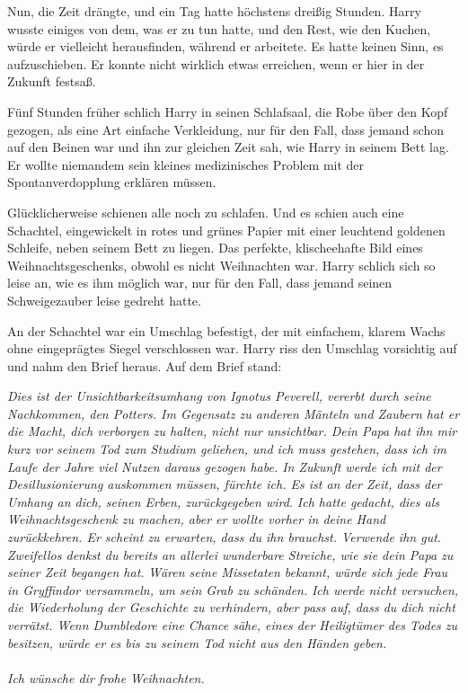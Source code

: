 Nun, die Zeit drängte, und ein Tag hatte höchstens dreißig Stunden. Harry wusste
einiges von dem, was er zu tun hatte, und den Rest, wie den Kuchen, würde er
vielleicht herausfinden, während er arbeitete. Es hatte keinen Sinn, es
aufzuschieben. Er konnte nicht wirklich etwas erreichen, wenn er hier in der
Zukunft festsaß.

Fünf Stunden früher schlich Harry in seinen Schlafsaal, die Robe über den Kopf
gezogen, als eine Art einfache Verkleidung, nur für den Fall, dass jemand schon
auf den Beinen war und ihn zur gleichen Zeit sah, wie Harry in seinem Bett lag.
Er wollte niemandem sein kleines medizinisches Problem mit der
Spontanverdopplung erklären müssen.

Glücklicherweise schienen alle noch zu schlafen. Und es schien auch eine
Schachtel, eingewickelt in rotes und grünes Papier mit einer leuchtend goldenen
Schleife, neben seinem Bett zu liegen. Das perfekte, klischeehafte Bild eines
Weihnachtsgeschenks, obwohl es nicht Weihnachten war. Harry schlich sich so
leise an, wie es ihm möglich war, nur für den Fall, dass jemand seinen
Schweigezauber leise gedreht hatte.

An der Schachtel war ein Umschlag befestigt, der mit einfachem, klarem Wachs
ohne eingeprägtes Siegel verschlossen war. Harry riss den Umschlag vorsichtig
auf und nahm den Brief heraus. Auf dem Brief stand:

\begin{center}
\emph{Dies ist der Unsichtbarkeitsumhang von Ignotus Peverell, vererbt durch
seine Nachkommen, den Potters. Im Gegensatz zu anderen Mänteln und Zaubern hat
er die Macht, dich verborgen zu halten, nicht nur unsichtbar. Dein Papa hat ihn
mir kurz vor seinem Tod zum Studium geliehen, und ich muss gestehen, dass ich im
Laufe der Jahre viel Nutzen daraus gezogen habe. In Zukunft werde ich mit der
Desillusionierung auskommen müssen, fürchte ich. Es ist an der Zeit, dass der
Umhang an dich, seinen Erben, zurückgegeben wird.} \emph{Ich hatte gedacht, dies
als Weihnachtsgeschenk zu machen, aber er wollte vorher in deine Hand
zurückkehren. Er scheint zu erwarten, dass du ihn brauchst. Verwende ihn gut.
Zweifellos denkst du bereits an allerlei wunderbare Streiche, wie sie dein Papa
zu seiner Zeit begangen hat.} \emph{Wären seine Missetaten bekannt, würde sich
jede Frau in Gryffindor versammeln, um sein Grab zu schänden.} \emph{Ich werde
nicht versuchen, die Wiederholung der Geschichte zu verhindern, aber pass auf,
dass du dich nicht verrätst. Wenn Dumbledore eine Chance sähe, eines der
Heiligtümer des Todes zu besitzen, würde er es bis zu seinem Tod nicht aus den
Händen geben.}\\~\\
\emph{Ich wünsche dir frohe Weihnachten.}
\end{center}

